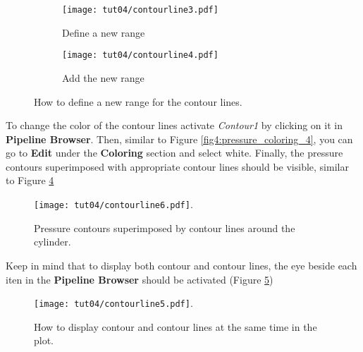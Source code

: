 \begin{figure}[htbp]
    \centering
    \begin{subfigure}[b]{.4\textwidth}
        \centering
        \texttt{[image: tut04/contourline3.pdf]}
        \caption{Define a new range}
        \label{fig4:contourby_4 a}
    \end{subfigure}
    \hfill
    \begin{subfigure}[b]{.4\textwidth}
        \centering
        \texttt{[image: tut04/contourline4.pdf]}
        \caption{Add the new range}
        \label{fig4:contourby_4 b}
    \end{subfigure}     
    \caption{How to define a new range for the contour lines.}
    \label{fig4:contourby_4}
\end{figure}

To change the color of the contour lines activate \textit{Contour1} by clicking on it in \textbf{Pipeline Browser}. Then, similar to Figure \ref{fig4:pressure_coloring_4}, you can go to \textbf{Edit} under the \textbf{Coloring} section and select white. Finally, the pressure contours superimposed with appropriate contour lines should be visible, similar to Figure \ref{fig4:contourline6_4}
\begin{figure}[htbp]
    \centering
    \texttt{[image: tut04/contourline6.pdf]}.
    \caption{Pressure contours superimposed by contour lines around the cylinder.}
    \label{fig4:contourline6_4}
\end{figure}
Keep in mind that to display both contour and contour lines, the eye beside each iten in the \textbf{Pipeline Browser} should be activated (Figure \ref{fig4:contourline5_4})
\begin{figure}[htbp]
    \centering
    \texttt{[image: tut04/contourline5.pdf]}.
    \caption{How to display contour and contour lines at the same time in the plot.}
    \label{fig4:contourline5_4}
\end{figure}


